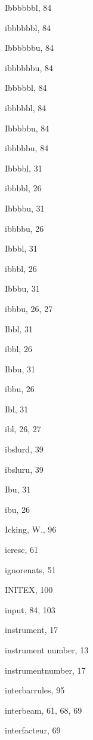 \begin{theindex}
  \indexspace

  \item {\Bslash Ibbbbbbl}, 84
  \item {\Bslash ibbbbbbl}, 84
  \item {\Bslash Ibbbbbbu}, 84
  \item {\Bslash ibbbbbbu}, 84
  \item {\Bslash Ibbbbbl}, 84
  \item {\Bslash ibbbbbl}, 84
  \item {\Bslash Ibbbbbu}, 84
  \item {\Bslash ibbbbbu}, 84
  \item {\Bslash Ibbbbl}, 31
  \item {\Bslash ibbbbl}, 26
  \item {\Bslash Ibbbbu}, 31
  \item {\Bslash ibbbbu}, 26
  \item {\Bslash Ibbbl}, 31
  \item {\Bslash ibbbl}, 26
  \item {\Bslash Ibbbu}, 31
  \item {\Bslash ibbbu}, 26, 27
  \item {\Bslash Ibbl}, 31
  \item {\Bslash ibbl}, 26
  \item {\Bslash Ibbu}, 31
  \item {\Bslash ibbu}, 26
  \item {\Bslash Ibl}, 31
  \item {\Bslash ibl}, 26, 27
  \item {\Bslash ibslurd}, 39
  \item {\Bslash ibsluru}, 39
  \item {\Bslash Ibu}, 31
  \item {\Bslash ibu}, 26
  \item {\sc Icking, W.}, 96
  \item {\Bslash icresc}, 61
  \item {\Bslash ignorenats}, 51
  \item INITEX, 100
  \item {\Bslash input}, 84, 103
  \item instrument, 17
  \item instrument number, 13
  \item {\Bslash instrumentnumber}, 17
  \item {\Bslash interbarrules}, 95
  \item {\Bslash interbeam}, 61, 68, 69
  \item {\Bslash interfacteur}, 69

\end{theindex}
